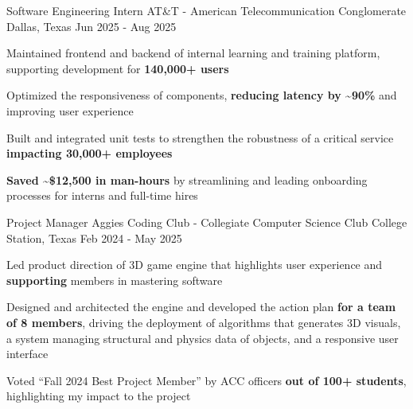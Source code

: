 \begin{cventries}
  \cventry
    {Software Engineering Intern} %
    {AT\&T - American Telecommunication Conglomerate} %
    {Dallas, Texas} %
    {Jun 2025 - Aug 2025} %
    {
      \begin{cvitems} %
        \item {Maintained frontend and backend of internal learning and training platform, supporting development for \textbf{140,000+ users}}
        \item {Optimized the responsiveness of components, \textbf{reducing latency by \textasciitilde90\%} and improving user experience}
        \item {Built and integrated unit tests to strengthen the robustness of a critical service \textbf{impacting 30,000+ employees}}
        \item {\textbf{Saved \textasciitilde\$12,500 in man-hours} by streamlining and leading onboarding processes for interns and full-time hires}
      \end{cvitems}
    }

  \cventry
    {Project Manager} %
    {Aggies Coding Club - Collegiate Computer Science Club} %
    {College Station, Texas} %
    {Feb 2024 - May 2025} %
    {
      \begin{cvitems} %
        \item {Led product direction of 3D game engine that highlights user experience and \textbf{supporting} members in mastering software}
        \item {Designed and architected the engine and developed the action plan \textbf{for a team of 8 members}, driving the deployment of algorithms that generates 3D visuals, a system managing structural and physics data of objects, and a responsive user interface}
        \item {Voted ``Fall 2024 Best Project Member'' by ACC officers \textbf{out of 100+ students}, highlighting my impact to the project}
      \end{cvitems}
    }


\end{cventries}
